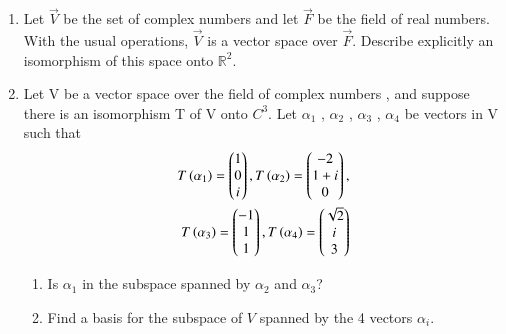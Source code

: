 \renewcommand{\theequation}{\theenumi}
\renewcommand{\thefigure}{\theenumi}
\begin{enumerate}[label=\thesubsection.\arabic*.,ref=\thesubsection.\theenumi]
%
\item Let $\vec{V}$ be the set of complex numbers and let $\vec{F}$ be the field of real numbers. With the usual operations, $\vec{V}$ is a vector space over $\vec{F}$. Describe explicitly an isomorphism of this space onto $\mathbb{R}^2$.
%
\\
%
\solution

\item Let V be a vector space over the field of complex numbers , and suppose there is an isomorphism T of V onto $C^{3}$. Let $\alpha_1$ , $\alpha_2$ , $\alpha_3$  , $\alpha_4$ be vectors in V such that 
   \begin{multline}
    \begin{aligned}
    T\left(\alpha_1\right)=\begin{pmatrix}1\\0\\i\end{pmatrix} , T\left(\alpha_2\right)=\begin{pmatrix}-2\\1+i\\0\end{pmatrix} ,\\ T\left(\alpha_3\right)=\begin{pmatrix}-1\\1\\1\end{pmatrix} , T\left(\alpha_4\right)=\begin{pmatrix}\sqrt{2}\\i\\3\end{pmatrix}
    \end{aligned}
    \end{multline}
\begin{enumerate}
\item     Is $\alpha_1$ in the subspace spanned by $\alpha_2$ and $\alpha_3$?
\\
%
\solution

\item Find a basis for the subspace of $V$ spanned by the 4 vectors $\alpha_i$.

\end{enumerate}
\end{enumerate}

